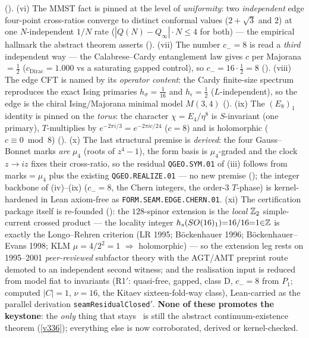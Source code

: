 \begin{winbox}
(). (vi) The MMST fact is pinned at the level of \emph{uniformity}: two
\emph{independent} edge four-point cross-ratios converge to distinct conformal values ($2{+}\sqrt3$ and $2$) at one
$N$-independent $1/N$ rate ($|Q(N){-}Q_\infty|\cdot N\le4$ for both) --- the empirical hallmark the abstract theorem
asserts (). (vii) The number $c_-{=}8$ is read a \emph{third} independent way ---
the Calabrese--Cardy entanglement law gives $c$ per Majorana $=\tfrac12$ ($c_{\mathrm{Dirac}}{=}1.000$ vs a saturating
gapped control), so $c_-{=}16\cdot\tfrac12{=}8$ (). (viii) The edge CFT is
named by its \emph{operator content}: the Cardy finite-size spectrum reproduces the exact Ising primaries
$h_\sigma{=}\tfrac1{16}$ and $h_\epsilon{=}\tfrac12$ ($L$-independent), so the edge is the chiral Ising/Majorana
minimal model $M(3,4)$ (). (ix) The $(E_8)_1$ identity is pinned on the
\emph{torus}: the character $\chi{=}E_4/\eta^8$ is $S$-invariant (one primary), $T$-multiplies by
$e^{-2\pi i/3}{=}e^{-2\pi i c/24}$ ($c{=}8$) and is holomorphic ($c\equiv0\bmod8$)
(). (x) The last structural premise is \emph{derived}: the four Gauss--Bonnet marks
\emph{are} $\mu_4$ (roots of $z^4{-}1$), the form basis is $\mu_4$-graded and the clock $z\!\to\!iz$ fixes their
cross-ratio, so the residual \texttt{QGEO.SYM.01} of (iii) follows from marks$=\mu_4$ plus the existing
\texttt{QGEO.REALIZE.01} --- no new premise (); the integer backbone of
(iv)--(ix) ($c_-{=}8$, the Chern integers, the order-$3$ $T$-phase) is kernel-hardened in Lean axiom-free as
\texttt{FORM.SEAM.EDGE.CHERN.01}. (xi) The certification package itself is re-founded
(): the $128$-spinor extension is the \emph{local} $\mathbb{Z}_2$
simple-current crossed product --- the locality integer $h_s(SO(16)_1){=}16/16{=}1{\in}\mathbb{Z}$ is exactly the
Longo--Rehren criterion (LR 1995; B\"ockenhauer 1996; B\"ockenhauer--Evans 1998; KLM $\mu{=}4/2^2{=}1$
$\Rightarrow$ holomorphic) --- so the extension leg rests on 1995--2001 \emph{peer-reviewed} subfactor theory
with the AGT/AMT preprint route demoted to an independent second witness; and the realisation input is reduced
from model fiat to invariants (R1$'$: quasi-free, gapped, class D, $c_-{=}8$ from $P_1$; computed $|C|{=}1$,
$\nu{=}16$, the Kitaev sixteen-fold-way class), Lean-carried as the parallel derivation
\texttt{seamResidualClosed$'$}. \textbf{None of these promotes the keystone}: the \emph{only} thing
that stays \mO\ is still the abstract continuum-existence theorem (\vref{v336}); everything else is now
corroborated, derived or kernel-checked.


\end{winbox}
